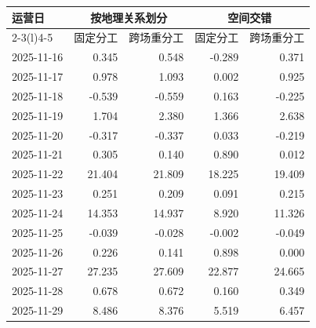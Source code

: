 \begin{tabular*}{0.92\linewidth}{@{\extracolsep{\fill}}lrrrr@{}}
\toprule
运营日 & \multicolumn{2}{c}{按地理关系划分} & \multicolumn{2}{c}{空间交错} \\
\cmidrule(lr){2-3}\cmidrule(l){4-5}
 & 固定分工 & 跨场重分工 & 固定分工 & 跨场重分工 \\
\midrule
2025-11-16 & 0.345 & 0.548 & -0.289 & 0.371 \\
2025-11-17 & 0.978 & 1.093 & 0.002 & 0.925 \\
2025-11-18 & -0.539 & -0.559 & 0.163 & -0.225 \\
2025-11-19 & 1.704 & 2.380 & 1.366 & 2.638 \\
2025-11-20 & -0.317 & -0.337 & 0.033 & -0.219 \\
2025-11-21 & 0.305 & 0.140 & 0.890 & 0.012 \\
2025-11-22 & 21.404 & 21.809 & 18.225 & 19.409 \\
2025-11-23 & 0.251 & 0.209 & 0.091 & 0.215 \\
2025-11-24 & 14.353 & 14.937 & 8.920 & 11.326 \\
2025-11-25 & -0.039 & -0.028 & -0.002 & -0.049 \\
2025-11-26 & 0.226 & 0.141 & 0.898 & 0.000 \\
2025-11-27 & 27.235 & 27.609 & 22.877 & 24.665 \\
2025-11-28 & 0.678 & 0.672 & 0.160 & 0.349 \\
2025-11-29 & 8.486 & 8.376 & 5.519 & 6.457 \\
\bottomrule
\end{tabular*}
